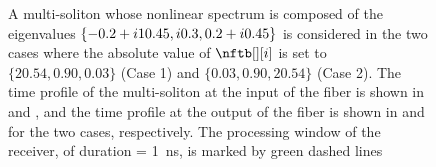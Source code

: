 \begin{figure}[t]
  \centering

  \figuresvspace

  \caption{A multi-soliton whose nonlinear spectrum is composed of the eigenvalues $\{-0.2+ i 10.45, i 0.3, 0.2+ i 0.45\}$ is considered in the two cases where the absolute value of $\nftb[][i]$ is set to $\{20.54, 0.90, 0.03\}$ (Case 1) and $\{0.03, 0.90, 20.54\}$ (Case 2). The time profile of the multi-soliton at the input of the fiber is shown in  and , and the time profile at the output of the fiber is shown in   and  for the two cases, respectively. The processing window of the receiver, of duration \Ts{} = \SI{1}{\ns}, is marked by green dashed lines}
  \label{fig:real_part_eigenvalues}
\end{figure}

